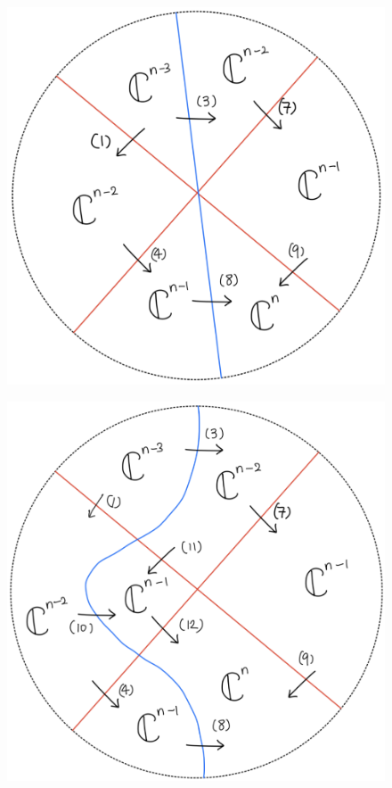\begin{figure}[H]
    \centering
    \includegraphics[scale = 0.45]{diagrams/cobord'4/29.png}
    \caption{}
    \label{fig:your-label}
\end{figure}
\begin{figure}[H]
    \centering
    \includegraphics[scale = 0.45]{diagrams/cobord'4/30.png}
    \caption{}
    \label{fig:your-label}
\end{figure}
